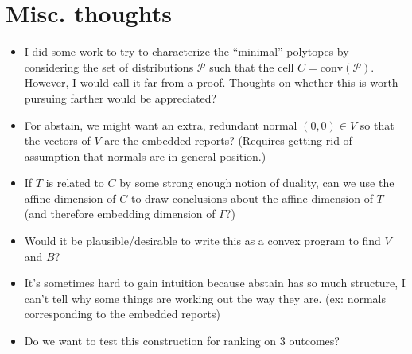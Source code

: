 \documentclass[12pt]{article}
\renewcommand{\P}{\mathcal{P}}
\newcommand{\conv}{\mathrm{conv}}
\begin{document}
\section{Misc. thoughts}
\begin{itemize}
	\item I did some work to try to characterize the ``minimal'' polytopes by considering the set of distributions $\P$ such that the cell $C = \conv(\P)$.
	However, I would call it far from a proof.
	Thoughts on whether this is worth pursuing farther would be appreciated?
	
	\item For abstain, we might want an extra, redundant normal $(0,0) \in V$ so that the vectors of $V$ are the embedded reports?  
	(Requires getting rid of assumption that normals are in general position.)
	
	\item If $T$ is related to $C$ by some strong enough notion of duality, can we use the affine dimension of $C$ to draw conclusions about the affine dimension of $T$ (and therefore embedding dimension of $\Gamma$?) 
	
	\item Would it be plausible/desirable to write this as a convex program to find $V$ and $B$?

	\item It's sometimes hard to gain intuition because abstain has so much structure, I can't tell why some things are working out the way they are. (ex: normals corresponding to the embedded reports)
	
	\item Do we want to test this construction for ranking on 3 outcomes?
	
\end{itemize}
\end{document}
